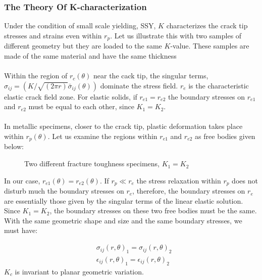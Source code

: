 \documentclass[12pt]{article}
\begin{document}
\subsubsection{The Theory Of K-characterization}
Under the condition of small scale yielding, SSY, $K$ characterizes the crack tip stresses and strains
even within $r_p$. Let us illustrate this with two samples of different geometry but they are loaded to the
same $K$-value. These samples are made of the same material and have the same thickness
\\\\
Within the region of $r_c(\theta)$ near the cack tip, the singular terms, $\sigma_{ij} = (K/\sqrt{(2 \pi r)} \bar{\sigma}_{ij}(\theta))$
dominate the stress field. $r_e$ is the characteristic elastic crack field zone. For elastic solids, if $r_{e1} = r_{e2}$ the boundary
stresses on $r_{e1}$ and $r_{e2}$ must be equal to each other, since $K_1 = K_2$.
\\\\
In metallic specimens, closer to the crack tip, plastic deformation takes place within $r_p(\theta)$. Let us
examine the regions within $r_{e1}$ and $r_{e2}$ as free bodies given below:
\begin{figure}[H]
    \centering
    \captionsetup{labelformat=empty}
    \caption{Two different fracture toughness specimens, $K_1 = K_2$ }
\end{figure}
In our case, $r_{e1}(\theta) = r_{e2}(\theta)$. If $r_p \ll r_e$ the
stress relaxation within $r_p$ does not disturb much the boundary stresses on $r_e$, therefore, the boundary
stresses on $r_e$ are essentially those given by the singular terms of the linear elastic solution. Since
$K_1 = K_2$, the boundary stresses on these two free bodies must be the same. With the same geometric
shape and size and the same boundary stresses, we must have:

\begin{align*}
    &\sigma_{ij}(r, \theta)_1 = \sigma_{ij}(r, \theta)_2 \\
    &\epsilon_{ij}(r, \theta)_1 = \epsilon_{ij}(r, \theta)_2 \tag{8} \label{8}
\end{align*}
$K_c$ is invariant to planar geometric variation.
 
\end{document}
